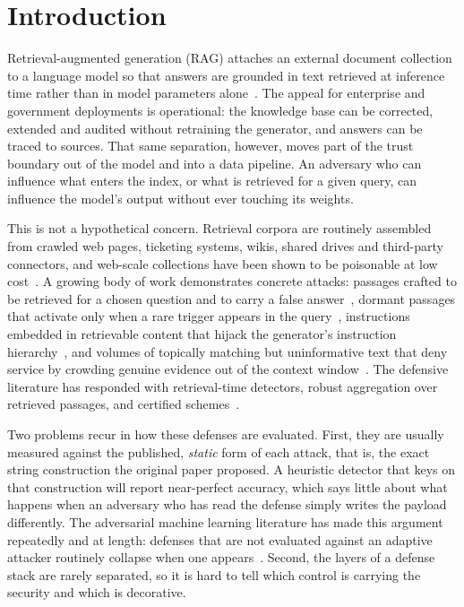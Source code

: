 \documentclass[information,article,submit,moreauthors]{Definitions/mdpi}
\begin{document}
\section{Introduction}

Retrieval-augmented generation (RAG) attaches an external document collection to a language
model so that answers are grounded in text retrieved at inference time rather than in model
parameters alone~\citep{lewis2020,guu2020,gao2024survey}. The appeal for enterprise and
government deployments is operational: the knowledge base can be corrected, extended and
audited without retraining the generator, and answers can be traced to sources. That same
separation, however, moves part of the trust boundary out of the model and into a data
pipeline. An adversary who can influence what enters the index, or what is retrieved for a
given query, can influence the model's output without ever touching its weights.

This is not a hypothetical concern. Retrieval corpora are routinely assembled from
crawled web pages, ticketing systems, wikis, shared drives and third-party connectors, and
web-scale collections have been shown to be poisonable at low cost~\citep{carlini2024poison}.
A growing body of work demonstrates concrete attacks: passages crafted to be retrieved for a
chosen question and to carry a false answer~\citep{zou2024,zhong2023}, dormant passages that
activate only when a rare trigger appears in the query~\citep{xue2024badrag,cheng2024trojanrag,chaudhari2024phantom},
instructions embedded in retrievable content that hijack the generator's instruction
hierarchy~\citep{greshake2023,liu2024formalizing}, and volumes of topically matching but
uninformative text that deny service by crowding genuine evidence out of the
context window~\citep{shafran2024jamming}. The defensive literature has responded with
retrieval-time detectors, robust aggregation over retrieved passages, and certified
schemes~\citep{xiang2024robustrag,zhou2025trustrag,weller2024defending}.

Two problems recur in how these defenses are evaluated. First, they are usually measured
against the published, \emph{static} form of each attack, that is, the exact string
construction the original paper proposed. A heuristic detector that keys on that construction will report
near-perfect accuracy, which says little about what happens when an adversary who has read the
defense simply writes the payload differently. The adversarial machine learning literature has
made this argument repeatedly and at length: defenses that are not evaluated against an
adaptive attacker routinely collapse when
one appears~\citep{carlini2017bypassing,athalye2018obfuscated,tramer2020adaptive,carlini2019evaluating}.
Second, the layers of a defense stack are rarely separated, so it is hard to tell which control
is carrying the security and which is decorative.
\end{document}
